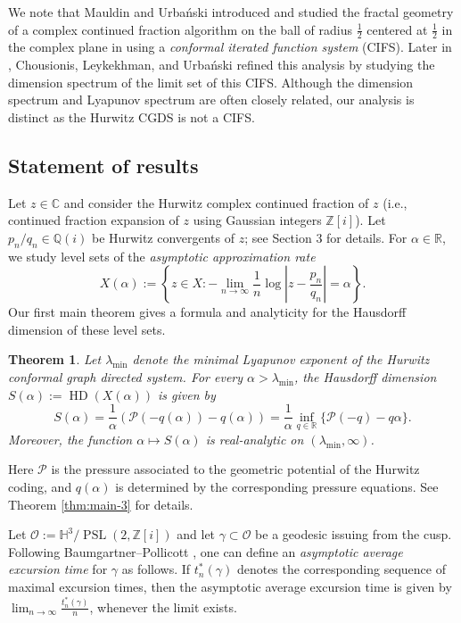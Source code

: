 \documentclass[11pt]{amsart}
\theoremstyle{plain}
\newtheorem{theorem}{Theorem}[section]
\theoremstyle{definition}
\renewcommand\~{\tilde}%
\numberwithin{equation}{section}
\begin{document}
We note that Mauldin and Urba\'nski introduced and studied the fractal geometry of a complex continued fraction algorithm on the ball of radius $\frac{1}{2}$ centered at $\frac{1}{2}$ in the complex plane in \cite{MU1996} using a {\it conformal iterated function system} (CIFS). Later in \cite{CLU19}, Chousionis, Leykekhman, and Urba\'nski refined this analysis by studying the dimension spectrum of the limit set of this CIFS. Although the dimension spectrum and Lyapunov spectrum are often closely related, our analysis is distinct as the Hurwitz CGDS is not a CIFS. 


\subsection{Statement of results}
Let $z \in \mathbb C$ and consider the Hurwitz complex continued fraction of $z$ (i.e., continued fraction expansion of $z$ using Gaussian integers $\mathbb Z[i]$). Let $p_n/q_n \in \mathbb Q(i)$ be Hurwitz convergents of $z$; see Section 3 for details. For $\alpha \in \mathbb R$, we study level sets of the {\it asymptotic approximation rate}
$$
X(\alpha):=
    \left\{
    z \in X :
    -\lim_{n\to\infty}
    \frac{1}{n}
    \log
    \left|
    z-\frac{p_n}{q_n}
    \right|
    =
    \alpha
    \right\}.
$$
Our first main theorem gives a formula and analyticity for the Hausdorff dimension of these level sets.

\begin{theorem}\label{thm:main-1}
Let $\lambda_{\min}$ denote the minimal Lyapunov exponent of the Hurwitz conformal graph directed system. For every $\alpha>\lambda_{\min}$, the Hausdorff dimension $S(\alpha):=\operatorname{HD}(X(\alpha))$
is given by
$$
    S(\alpha)
    =
    \frac{1}{\alpha}
    \left(\mathcal P(-q(\alpha))-q(\alpha)\right)
    =
    \frac{1}{\alpha}
    \inf_{q\in\mathbb R}
    \{\mathcal P(-q)-q\alpha\}.
$$
Moreover, the function $\alpha\mapsto S(\alpha)$ is real-analytic on $(\lambda_{\min},\infty)$.
\end{theorem}

Here $\mathcal P$ is the pressure associated to the geometric potential of the Hurwitz coding, and $q(\alpha)$ is determined by the corresponding pressure equations. See Theorem \ref{thm:main-3} for details.

\medskip

Let $\mathcal O:=\mathbb H^3/\operatorname{PSL}(2,\mathbb Z[i])$ and let $\gamma \subset \mathcal O$ be a geodesic issuing from the cusp.
Following Baumgartner--Pollicott \cite{baumgartnerP}, one can define an {\it asymptotic average excursion time} for $\gamma$ as follows. If $t_n^*(\gamma)$ denotes the corresponding sequence of maximal excursion times, then the asymptotic average excursion time is
given by $\lim_{n\to\infty}\frac{t_n^*(\gamma)}{n}$,
whenever the limit exists. 
\end{document}
